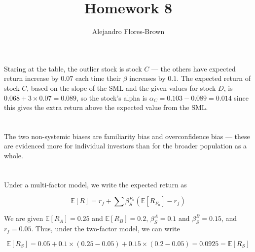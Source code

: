 \documentclass[12pt, letterpaper, parskip = full]{article}
\title{Homework 8}
\author{Alejandro Flores-Brown}
\newcommand{\Ex}[1]{\mathbb{E}\left[#1\right]}
\begin{document}
	\maketitle

    \section{}

    Staring at the table, the outlier stock is stock \(C\) --- the others have expected return increase by \(0.07\) each time their \(\beta\) increases by \(0.1\). The expected return of stock \(C\), based on the slope of the SML and the given values for stock \(D\), is \(0.068 + 3 \times 0.07 = 0.089\), so the stock's alpha is \( \boxed{\alpha_C = 0.103 - 0.089 = 0.014} \) since this gives the extra return above the expected value from the SML. 

    \section{}
    
    The two non-systemic biases are familiarity bias and overconfidence bias --- these are evidenced more for individual investors than for the broader population as a whole. 

    \section{}

    Under a multi-factor model, we write the expected return as 

    \[ \Ex{R} = r_f + \sum \beta_S^{F_n} \left( \Ex{R_{F_n}} - r_f \right)    \]

    We are given \(\Ex{R_A} = 0.25\) and \(\Ex{R_B} = 0.2\), \(\beta_S^A = 0.1\) and \(\beta_S^B = 0.15\), and \(r_f = 0.05\). Thus, under the two-factor model, we can write

    \[  \Ex{R_S} = 0.05 + 0.1 \times (0.25 - 0.05) + 0.15 \times (0.2 - 0.05) = \boxed{0.0925 = \Ex{R_S}} \]
\end{document}
